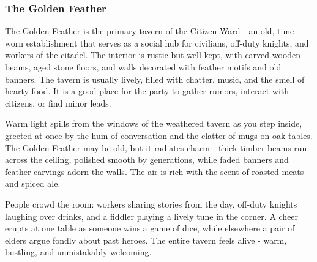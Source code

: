 \subsubsection*{ The Golden Feather}
{\entryfont The Golden Feather is the primary tavern of the Citizen Ward - an old, time-worn establishment that serves as a social hub for civilians, off-duty knights, and workers of the citadel. The interior is rustic but well-kept, with carved wooden beams, aged stone floors, and walls decorated with feather motifs and old banners. The tavern is usually lively, filled with chatter, music, and the smell of hearty food. It is a good place for the party to gather rumors, interact with citizens, or find minor leads.}
\begin{DndReadAloud}
	Warm light spills from the windows of the weathered tavern as you step inside, greeted at once by the hum of conversation and the clatter of mugs on oak tables. The Golden Feather may be old, but it radiates charm—thick timber beams run across the ceiling, polished smooth by generations, while faded banners and feather carvings adorn the walls. The air is rich with the scent of roasted meats and spiced ale.

	People crowd the room: workers sharing stories from the day, off-duty knights laughing over drinks, and a fiddler playing a lively tune in the corner. A cheer erupts at one table as someone wins a game of dice, while elsewhere a pair of elders argue fondly about past heroes. The entire tavern feels alive - warm, bustling, and unmistakably welcoming.
\end{DndReadAloud}
